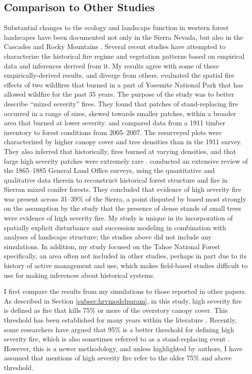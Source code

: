 \subsection{Comparison to Other Studies}
Substantial changes to the ecology and landscape function in western forest landscapes have been documented not only in the Sierra Nevada, but also in the Cascades and Rocky Mountains \citep{Agee1993,Hessburg2005,Baker2012,Mallek2013,Baker2014}. Several recent studies have attempted to characterize the historical fire regime and vegetation patterns based on empirical data and inferences derived from it. My results agree with some of these empirically-derived results, and diverge from others.
%
\citet{Collins2010} evaluated the spatial fire effects of two wildfires that burned in a part of Yosemite National Park that has allowed wildfire for the past 35 years. The purpose of the study was to better describe ``mixed severity'' fires. They found that patches of stand-replacing fire occurred in a range of sizes, skewed towards smaller patches, within a broader area that burned at lower severity.
%
\citet{Collins2011} and \citet{Stephens2015} compared data from a 1911 timber inventory to forest conditions from 2005--2007. The resurveyed plots were characterized by higher canopy cover and tree densities than in the 1911 survey. They also inferred that historically, fires burned at varying densities, and that large high severity patches were extremely rare \citep{Collins2011,Stephens2015}.
%
\citet{Baker2014} conducted an extensive review of the 1865--1885 General Land Office surveys, using the quantitative and qualitative data therein to reconstruct historical forest structure and fire in Sierran mixed conifer forests. They concluded that evidence of high severity fire was present across 31--39\% of the Sierra, a point disputed by \citet{Fule2014} based most strongly on the assumption by the \citet{Baker2014} study that the presence of dense stands of small trees were evidence of high severity fire. 
%
My study is unique in its incorporation of spatially explicit disturbance and succession modeling in combination with analyses of landscape structure; the studies above did not include any simulations. In addition, my study focused on the Tahoe National Forest specifically, an area often not included in other studies, perhaps in part due to its history of active management and use, which makes field-based studies difficult to use for making inferences about historical systems.

I first compare the results from my simulations to those reported in other papers. As described in Section \ref{subsec:hrvmodelparam}, in this study, high severity fire is defined as fire that kills 75\% or more of the overstory canopy cover. This threshold has been established for many years within the literature \citep{Agee1993,Agee2007,Miller2009,Baker2014}. Recently, some researchers have argued that 95\% is a better threshold for defining high severity fire, which is also sometimes referred to as a stand-replacing event \citep{Mallek2013,Fule2014}. However, this is a newer methodology, and unless highlighted by authors, I have assumed that mentions of high severity fire refer to the older 75\% and above threshold.

